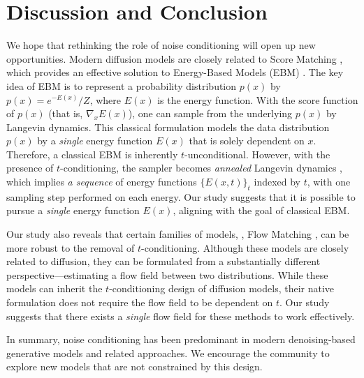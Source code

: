\section{Discussion and Conclusion}\label{sec:conclusion}

We hope that rethinking the role of noise conditioning will open up new opportunities. 
Modern diffusion models are closely related to Score Matching \cite{hyvarinen2005estimation,song2019ncsn,song2021scorebased}, which provides an effective solution to Energy-Based Models (EBM) \cite{hopfield1982neural,ackley1985learning,lecun2006tutorial,song2021train}. The key idea of EBM is to represent a probability distribution $p(x)$ by $p(x) = e^{-E(x)} / Z$, where $E(x)$ is the energy function. With the score function of $p(x)$ (that is, $\nabla_x E(x)$), one can sample from the underlying $p(x)$ by Langevin dynamics. This classical formulation models the data distribution $p(x)$ by a \textit{single} energy function $E(x)$ that is solely dependent on $x$. Therefore, a classical EBM is inherently $t$-unconditional. However, with the presence of $t$-conditioning, the sampler becomes \textit{annealed} Langevin dynamics \cite{song2019ncsn}, which implies \textit{a sequence} of energy functions $\{E(x, t)\}_t$ indexed by $t$, with one sampling step performed on each energy. Our study suggests that it is possible to pursue a \textit{single} energy function $E(x)$, aligning with the goal of classical EBM.

Our study also reveals that certain families of models, \eg, Flow Matching \cite{lipman2023flow,liu2023flow,albergo2023stochastic}, can be more robust to the removal of $t$-conditioning. Although these models are closely related to diffusion, they can be formulated from a substantially different perspective---estimating a flow field between two distributions. While these models can inherit the $t$-conditioning design of diffusion models, their native formulation does not require the flow field to be dependent on $t$. Our study suggests that there exists a \textit{single} flow field for these methods to work effectively.

In summary, noise conditioning has been predominant in modern denoising-based generative models and related approaches. We encourage the community to explore new models that are not constrained by this design.

